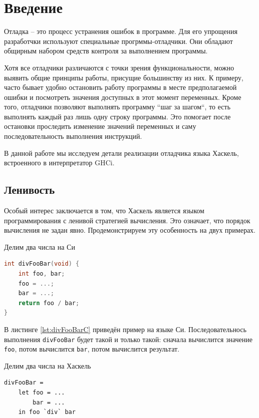 \documentclass[fontsize=14pt, paper=a4, pagesize, DIV=calc]{scrartcl}
\def\code#1{\texttt{#1}}
\begin{document}
\tableofcontents
\newpage

\section{Введение}

Отладка -- это процесс устранения ошибок в программе. Для его упрощения
разработчки используют специальные прогрммы-отладчики. Они обладают общирным
набором средств контроля за выполнением программы. 

Хотя все отладчики различаются с точки зрения функциональности, можно выявить
общие принципы работы, присущие большинству из них. К примеру, часто бывает
удобно остановить работу программы в месте предполагаемой ошибки и посмотреть
значения доступных в этот момент переменных. Кроме того, отладчики позволяют
выполнять программу ``шаг за шагом``, то есть выполнять каждый раз лишь одну
строку программы. Это помогает после остановки проследить изменение значений
переменных и саму последовательность выполнения инструкций.

В данной работе мы исследуем детали реализации отладчика языка Хаскель,
встроенного в интерпретатор GHCi. 

\subsection{Ленивость}

Особый интерес заключается в том, что Хаскель является языком программирования
с ленивой стратегией вычисления. Это означает, что порядок вычисления не задан
явно. Продемонстрируем эту особенность на двух примерах.

\begin{ListingEnv}
\caption{Делим два числа на Си}
\label{lst:divFooBarC}
\begin{lstlisting}[language=c]
int divFooBar(void) {
    int foo, bar;
    foo = ...;
    bar = ...;
    return foo / bar;
}
\end{lstlisting}
\end{ListingEnv}

В листинге \ref{lst:divFooBarC} приведён пример на языке Си. Последовательнось
выполнения \code{divFooBar} будет такой и только такой: сначала вычислится
значение \code{foo}, потом вычислится \code{bar}, потом вычислится результат.

\begin{ListingEnv}
\caption{Делим два числа на Хаскель}
\label{lst:divFooBarHaskell}
\begin{lstlisting}
divFooBar =
    let foo = ...
        bar = ...
    in foo `div` bar
\end{lstlisting}
\end{ListingEnv}
\end{document}
